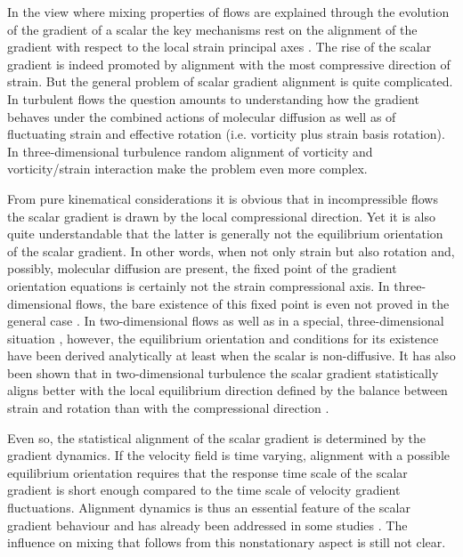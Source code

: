 \documentclass[doublespacing]{elsart}
\begin{document}
In the view where mixing properties of flows are
explained through the evolution of the 
gradient of a scalar 
the key mechanisms  
rest on the alignment of the gradient with respect to
the local strain principal axes
\cite{P94,S99,Val01,Bal03}.
The rise of the scalar gradient is indeed promoted
by alignment with the most compressive direction of strain.
But
the general problem of scalar gradient alignment is quite 
complicated.
In turbulent flows 
the question amounts to understanding how the gradient
behaves under the combined actions of molecular diffusion
as well as
of
fluctuating
strain and effective rotation 
(i.e. vorticity plus strain basis rotation). 
In three-dimensional turbulence random alignment
of vorticity
and vorticity/strain interaction make the problem even
more complex.

From pure kinematical considerations it is obvious  
that in incompressible flows the scalar gradient is drawn
by the local compressional direction. Yet it is also quite
understandable that the latter is generally not the
equilibrium orientation of the scalar gradient. 
In other words, when not only strain but also rotation
and, possibly, molecular diffusion are present, the fixed
point of the gradient orientation equations is certainly
not the strain compressional axis.
In three-dimensional flows, the bare existence of
this fixed point is even not proved in the general case
\cite{TK94}.
In two-dimensional flows \cite{Lal99} as well 
as in a special, three-dimensional situation \cite{G06,GG06},
however,
the equilibrium orientation and conditions for its existence
have been derived analytically
at least when the scalar is non-diffusive.
It has also been shown that in two-dimensional turbulence
the scalar gradient 
statistically aligns better 
with the local equilibrium direction defined by the balance 
between strain and rotation than with the compressional
direction
\cite{Lal99}.

Even so,
the statistical alignment of the scalar gradient
is determined by the gradient dynamics.
If the velocity field is time varying, alignment with a possible
equilibrium orientation requires that the response 
time scale of the scalar gradient
is
short
enough compared to the 
time scale of 
velocity gradient fluctuations.
Alignment dynamics is thus an essential 
feature of the scalar gradient behaviour and has  
already been addressed in some studies \cite{S99,Bal03,G06,Lal01,Kal00,Gal05}.
The influence on mixing that follows from this 
nonstationary aspect is still not clear.
\end{document}
